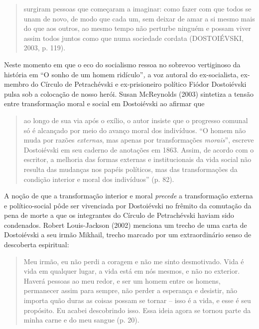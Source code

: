\begin{quote}
surgiram pessoas que começaram a imaginar: como fazer com que todos se
unam de novo, de modo que cada um, sem deixar de amar a si mesmo mais do
que aos outros, ao mesmo tempo não perturbe ninguém e possam viver assim
todos juntos como que numa sociedade cordata (DOSTOIÉVSKI, 2003, p.
119).
\end{quote}

Neste momento em que o eco do socialismo ressoa no sobrevoo vertiginoso
da história em ``O sonho de um homem ridículo''\emph{,} a voz autoral do
ex-socialista, ex-membro do Círculo de Petrachévski e ex-prisioneiro
político Fiódor Dostoiévski pulsa sob a colocação de nosso herói. Susan
McReynolds (2003) sintetiza a tensão entre transformação moral e social
em Dostoiévski ao afirmar que

\begin{quote}
ao longo de sua via após o exílio, o autor insiste que o progresso
comunal só é alcançado por meio do avanço moral dos indivíduos. ``O
homem não muda por razões \emph{externas}, mas apenas por transformações
\emph{morais}'', escreve Dostoiévski em seu caderno de anotações em
1863. Assim, de acordo com o escritor, a melhoria das formas externas e
institucionais da vida social não resulta das mudanças nos papéis
políticos, mas das transformações da condição interior e moral dos
indivíduos'' (p. 82).
\end{quote}

A noção de que a transformação interior e moral \emph{precede} a
transformação externa e político-social pôde ser vivenciada por
Dostoiévski no frêmito da comutação da pena de morte a que os
integrantes do Círculo de Petrachévski haviam sido condenados. Robert
Louis-Jackson (2002) menciona um trecho de uma carta de Dostoiévski a
seu irmão Mikhail, trecho marcado por um extraordinário senso de
descoberta espiritual:

\begin{quote}
Meu irmão, eu não perdi a coragem e não me sinto desmotivado. Vida é
vida em qualquer lugar, a vida está em nós mesmos, e não no exterior.
Haverá pessoas ao meu redor, e ser um homem entre os homens, permanecer
assim para sempre, não perder a esperança e desistir, não importa quão
duras as coisas possam se tornar -- isso é a vida, e esse é seu
propósito. Eu acabei descobrindo isso. Essa ideia agora se tornou parte
da minha carne e do meu sangue (p. 20).
\end{quote}

